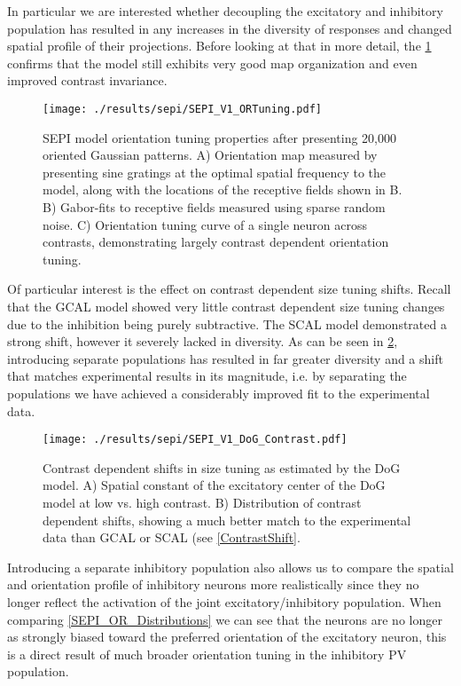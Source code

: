 In particular we are interested whether decoupling the excitatory and
inhibitory population has resulted in any increases in the diversity
of responses and changed spatial profile of their projections. Before
looking at that in more detail, the \ref{SEPIORTuning} confirms that
the model still exhibits very good map organization and even improved
contrast invariance.

\begin{figure}
	\centering
    \texttt{[image: ./results/sepi/SEPI\_V1\_ORTuning.pdf]}
	\caption{SEPI model orientation tuning properties after presenting
      20,000 oriented Gaussian patterns. A) Orientation map measured
      by presenting sine gratings at the optimal spatial frequency to
      the model, along with the locations of the receptive fields
      shown in B. B) Gabor-fits to receptive fields measured using
      sparse random noise. C) Orientation tuning curve of a single
      neuron across contrasts, demonstrating largely contrast
      dependent orientation tuning.}
	\label{SEPIORTuning}
\end{figure}

Of particular interest is the effect on contrast dependent size tuning
shifts. Recall that the GCAL model showed very little contrast
dependent size tuning changes due to the inhibition being purely
subtractive. The SCAL model demonstrated a strong shift, however it
severely lacked in diversity. As can be seen in \ref{SEPI_DoG_Contrast},
introducing separate populations has resulted in far greater diversity
and a shift that matches experimental results in its magnitude,
i.e. by separating the populations we have achieved a considerably
improved fit to the experimental data.

\begin{figure}
	\centering
        \texttt{[image: ./results/sepi/SEPI\_V1\_DoG\_Contrast.pdf]}
	\caption{Contrast dependent shifts in size tuning as estimated by
      the DoG model. A) Spatial constant of the excitatory center of
      the DoG model at low vs. high contrast. B) Distribution of
      contrast dependent shifts, showing a much better match to the
      experimental data than GCAL or SCAL (see \ref{ContrastShift}.}
	\label{SEPI_DoG_Contrast}
\end{figure}

Introducing a separate inhibitory population also allows us to compare
the spatial and orientation profile of inhibitory neurons more
realistically since they no longer reflect the activation of the joint
excitatory/inhibitory population. When comparing
\ref{SEPI_OR_Distributions} we can see that the neurons are no longer
as strongly biased toward the preferred orientation of the excitatory
neuron, this is a direct result of much broader orientation tuning in
the inhibitory PV population.

